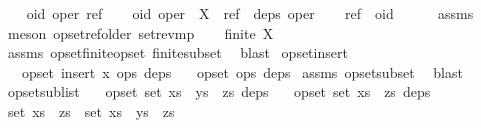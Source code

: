 \begin{isabellebody}
\isamarkupfalse%
\isanewline
\ \ \isamarkupfalse%
\ oid\ oper\ ref\isanewline
\ \ \isamarkupfalse%
\ {\isachardoublequoteopen}{\isacharparenleft}oid{\isacharcomma}\ oper{\isacharparenright}\ {\isasymin}\ X{\isachardoublequoteclose}\ \ {\isachardoublequoteopen}ref\ {\isasymin}\ deps\ oper{\isachardoublequoteclose}\isanewline
\ \ \isamarkupfalse%
\ {\isachardoublequoteopen}ref\ {\isacharless}\ oid{\isachardoublequoteclose}\isanewline
\ \ \ \ \isamarkupfalse%
\ assms\ \isamarkupfalse%
\ {\isacharparenleft}meson\ opset{\isachardot}ref{\isacharunderscore}older\ set{\isacharunderscore}rev{\isacharunderscore}mp{\isacharparenright}\isanewline
{}\isamarkupfalse%
\isanewline
\ \ \isamarkupfalse%
\ {\isachardoublequoteopen}finite\ X{\isachardoublequoteclose}\isanewline
\ \ \ \ \isamarkupfalse%
\ assms\ opset{\isachardot}finite{\isacharunderscore}opset\ finite{\isacharunderscore}subset\ \isamarkupfalse%
\ blast\isanewline
{}\isamarkupfalse%
%
\endisatagproof
{\isafoldproof}%
%
\isadelimproof
\isanewline
%
\endisadelimproof
\isanewline
{}\isamarkupfalse%
\ opset{\isacharunderscore}insert{\isacharcolon}\isanewline
\ \ \ {\isachardoublequoteopen}opset\ {\isacharparenleft}insert\ x\ ops{\isacharparenright}\ deps{\isachardoublequoteclose}\isanewline
\ \ \ {\isachardoublequoteopen}opset\ ops\ deps{\isachardoublequoteclose}\isanewline
%
\isadelimproof
%
\endisadelimproof
%
\isatagproof
{}\isamarkupfalse%
\ assms\ opset{\isacharunderscore}subset\ \isamarkupfalse%
\ blast%
\endisatagproof
{\isafoldproof}%
%
\isadelimproof
\isanewline
%
\endisadelimproof
\isanewline
{}\isamarkupfalse%
\ opset{\isacharunderscore}sublist{\isacharcolon}\isanewline
\ \ \ {\isachardoublequoteopen}opset\ {\isacharparenleft}set\ {\isacharparenleft}xs\ {\isacharat}\ ys\ {\isacharat}\ zs{\isacharparenright}{\isacharparenright}\ deps{\isachardoublequoteclose}\isanewline
\ \ \ {\isachardoublequoteopen}opset\ {\isacharparenleft}set\ {\isacharparenleft}xs\ {\isacharat}\ zs{\isacharparenright}{\isacharparenright}\ deps{\isachardoublequoteclose}\isanewline
%
\isadelimproof
%
\endisadelimproof
%
\isatagproof
{}\isamarkupfalse%
\ {\isacharminus}\isanewline
\ \ \isamarkupfalse%
\ {\isachardoublequoteopen}set\ {\isacharparenleft}xs\ {\isacharat}\ zs{\isacharparenright}\ {\isasymsubseteq}\ set\ {\isacharparenleft}xs\ {\isacharat}\ ys\ {\isacharat}\ zs{\isacharparenright}{\isachardoublequoteclose}\isanewline

\end{isabellebody}
